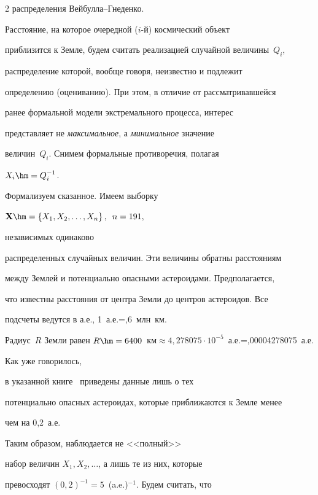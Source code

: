 \begin{multicols}{2}
распределения Вей\-бул\-ла--Гне\-денко.





Расстояние, на которое очередной ($i$-й) космический объект


приблизится к Земле, будем считать реализацией случайной величины~$Q_i$, 


распределение которой, вообще говоря, неизвестно и подлежит


определению (оцениванию). При этом, в отличие от рассматривавшейся


ранее формальной модели экстремального процесса, интерес


представляет не {\it максимальное}, а \textit{минимальное} значение


величин~$Q_i$. Снимем формальные противоречия, полагая


$X_i\hm=Q_i^{-1}$.





Формализуем сказанное. Имеем выборку


$\mathbf{X}\hm=\{X_1,X_2,\ldots ,X_n\}\,,\enskip n=191,$


 независимых одинаково


распределенных случайных величин. Эти величины обратны расстояниям


между Землей и потенциально опасными астероидами. Предполагается,


что известны расстояния от центра Земли до центров астероидов. Все


подсчеты ведутся в а.е., 1~а.е.\;=,6~млн~км.


Радиус~$R$ Земли равен $R\hm=6400$~км\;$\approx 4{,}278075\cdot


10^{-5}$~а.е.\;=,00004278075~а.е. 





Как уже говорилось,


в указанной книге~\cite{Atkinson2001} приведены данные лишь о тех


потенциально опасных астероидах, которые приближаются к Земле менее


чем на 0,2~а.е. 


Таким образом, наблюдается не <<полный>>


набор величин $X_1,X_2,\ldots$, а лишь те из них, которые


превосходят $(0{,}2)^{-1}=5$~(a.e.)$^{-1}$. Будем считать, что



\end{multicols}
